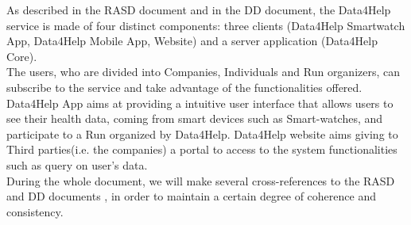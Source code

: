 As described in the RASD document and in the DD document, the Data4Help service is made of four distinct components: three clients (Data4Help Smartwatch App, Data4Help Mobile App, Website) and a server application (Data4Help Core). \\
\noindent The users, who are divided into Companies, Individuals and Run organizers, can subscribe to the service and take advantage of the functionalities offered.\\

\noindent Data4Help App aims at providing a intuitive user interface that allows users to see their health data, coming from smart devices such as Smart-watches, and participate to a Run organized by Data4Help. Data4Help website aims giving to Third parties(i.e. the companies) a portal to access to the system functionalities such as query on user's data. \\

\noindent During the whole document, we will make several cross-references to the RASD and DD documents , in order to maintain a certain degree of coherence and consistency.

